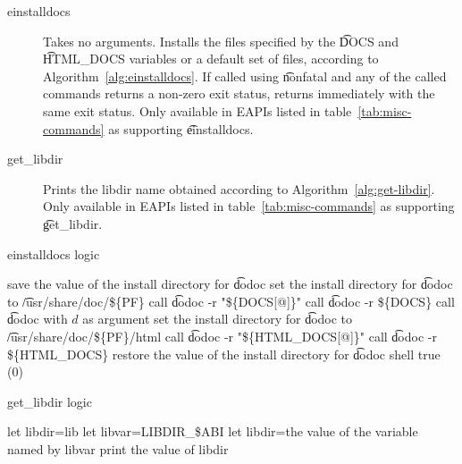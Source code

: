 \begin{description}
\item[einstalldocs]  Takes no arguments. Installs the files specified
    by the \t{DOCS} and \t{HTML\_DOCS} variables or a default set of files, according to
    Algorithm~\ref{alg:einstalldocs}. If called using \t{nonfatal} and any of the called commands
    returns a non-zero exit status, returns immediately with the same exit status. Only available
    in EAPIs listed in table~\ref{tab:misc-commands} as supporting \t{einstalldocs}.

\item[get\_libdir]  Prints the libdir name obtained according to
    Algorithm~\ref{alg:get-libdir}. Only available in EAPIs listed in table~\ref{tab:misc-commands}
    as supporting \t{get\_libdir}.
\end{description}

\begin{algorithm}
\caption{einstalldocs logic} \label{alg:einstalldocs}
\begin{algorithmic}[1]
\STATE save the value of the install directory for \t{dodoc}
\STATE set the install directory for \t{dodoc} to \t{/usr/share/doc/\$\{PF\}}
    \STATE call \t{dodoc -r "\$\{DOCS[@]\}"}
    \STATE call \t{dodoc -r \$\{DOCS\}}
            \STATE call \t{dodoc} with $d$ as argument
        \ENDIF
    \ENDFOR
\ENDIF
\STATE set the install directory for \t{dodoc} to \t{/usr/share/doc/\$\{PF\}/html}
    \STATE call \t{dodoc -r "\$\{HTML\_DOCS[@]\}"}
    \STATE call \t{dodoc -r \$\{HTML\_DOCS\}}
\ENDIF
\STATE restore the value of the install directory for \t{dodoc}
\RETURN shell true (0)
\end{algorithmic}
\end{algorithm}

\begin{algorithm}
\caption{get\_libdir logic} \label{alg:get-libdir}
\begin{algorithmic}[1]
\STATE let libdir=lib
    \STATE let libvar=LIBDIR\_\$ABI
        \STATE let libdir=the value of the variable named by libvar
    \ENDIF
\ENDIF
\STATE print the value of libdir
\end{algorithmic}
\end{algorithm}

